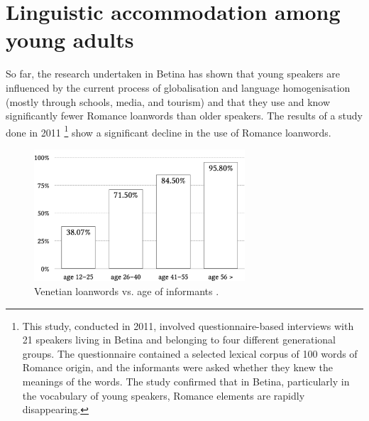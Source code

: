\documentclass[output=paper]{LSP/langsci}
\begin{document}
\section{Linguistic accommodation among young adults}
So far, the research undertaken in Betina has shown that young speakers are influenced by the current process of globalisation and language homogenisation (mostly through schools, media, and tourism) and that they use and know significantly fewer Romance loanwords than older speakers. The results of a study done in 2011 \citep{skevin_izmedu_2012}\footnote{This study, conducted in 2011, involved questionnaire-based interviews with 21 speakers living in Betina and belonging to four different generational groups. The questionnaire contained a selected lexical corpus of 100 words of Romance origin, and the informants were asked whether they knew the meanings of the words. The study confirmed that in Betina, particularly in the vocabulary of young speakers, Romance elements are rapidly disappearing.} show a significant decline in the use of Romance loanwords. 
  
\begin{figure}
\includegraphics[width=0.7\textwidth]{illustrations/skevin_fig1}
\caption{Venetian loanwords vs. age of informants \citep[175]{skevin_izmedu_2012}.}
\label{fig:1}
\end{figure}
\end{document}
